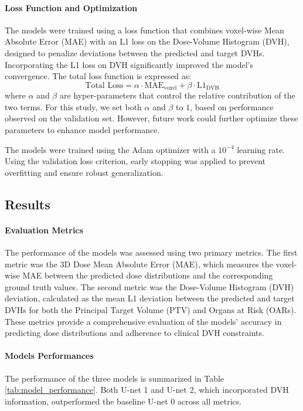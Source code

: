 \paragraph{Loss Function and Optimization}
The models were trained using a loss function that combines voxel-wise Mean Absolute Error (MAE) with an L1 loss on the Dose-Volume Histogram (DVH), designed to penalize deviations between the predicted and target DVHs.
Incorporating the L1 loss on DVH significantly improved the model’s convergence.
The total loss function is expressed as:
$$
\text{Total Loss} = \alpha \cdot \text{MAE}_{\text{voxel}} + \beta \cdot \text{L1}_{\text{DVH}}
$$
where $\alpha$ and $\beta$ are hyper-parameters that control the relative contribution of the two terms.
For this study, we set both $\alpha$ and $\beta$ to $1$, based on performance observed on the validation set.
However, future work could further optimize these parameters to enhance model performance.

The models were trained using the Adam optimizer with a $10^{-4}$ learning rate.
Using the validation loss criterion, early stopping was applied to prevent overfitting and ensure robust generalization.

\subsection{Results}
\paragraph{Evaluation Metrics}  
The performance of the models was assessed using two primary metrics.
The first metric was the 3D Dose Mean Absolute Error (MAE), which measures the voxel-wise MAE between the predicted dose distributions and the corresponding ground truth values.
The second metric was the Dose-Volume Histogram (DVH) deviation, calculated as the mean L1 deviation between the predicted and target DVHs for both the Principal Target Volume (PTV) and Organs at Risk (OARs).
These metrics provide a comprehensive evaluation of the models' accuracy in predicting dose distributions and adherence to clinical DVH constraints.

\paragraph{Models Performances}
The performance of the three models is summarized in Table \ref{tab:model_performance}.
Both U-net 1 and U-net 2, which incorporated DVH information, outperformed the baseline U-net 0 across all metrics.

